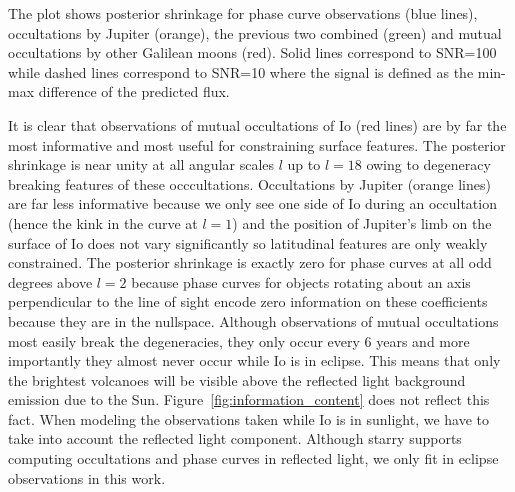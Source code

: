 \documentclass[modern]{aastex62}
\begin{document}
The plot shows posterior shrinkage for phase curve observations (blue lines), occultations by Jupiter (orange), the previous two combined (green) and mutual occultations by other Galilean moons (red). 
Solid lines correspond to SNR=100 while dashed lines correspond to SNR=10 where the signal is defined as the min-max difference of the predicted flux.

        It is clear that observations of mutual occultations of Io (red lines) are by far the most informative and most useful for constraining surface features. The posterior shrinkage is near unity at all angular scales $l$ up to $l=18$ owing to degeneracy breaking features of these occcultations. 
        Occultations by Jupiter (orange lines) are far less informative because we only see one side of Io during an occultation (hence the kink in the curve at $l=1$) and the position of Jupiter's limb on the surface of Io does not vary significantly so latitudinal features are only weakly constrained.
        The posterior shrinkage is exactly zero for phase curves at all odd degrees above $l=2$ because phase curves for objects rotating about an axis perpendicular to the line of sight encode zero information on these coefficients because they are in the nullspace.
Although observations of mutual occultations most easily break the degeneracies, they only occur every 6 years and more importantly they almost never occur while Io is in eclipse.
This means that only the brightest volcanoes will be visible above the reflected light background emission due to the Sun.
Figure~\ref{fig:information_content} does not reflect this fact.
When modeling the observations taken while Io is in sunlight, we have to take into account the reflected light component.
Although \textsf{starry} supports computing occultations and phase curves in reflected light, we only fit in eclipse observations in this work.
\end{document}
